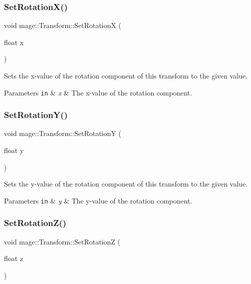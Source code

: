 \subsubsection{\texorpdfstring{Set\+Rotation\+X()}{SetRotationX()}}
{\footnotesize\ttfamily void mage\+::\+Transform\+::\+Set\+RotationX (\begin{DoxyParamCaption}\item[{float}]{x }\end{DoxyParamCaption})}

Sets the x-\/value of the rotation component of this transform to the given value.


\begin{DoxyParams}[1]{Parameters}
\mbox{\tt in}  & {\em x} & The x-\/value of the rotation component. \\
\hline
\end{DoxyParams}
\hypertarget{structmage_1_1_transform_a95c83ba282bf84aeb1c49d9ba8242609}{}\label{structmage_1_1_transform_a95c83ba282bf84aeb1c49d9ba8242609} 
\subsubsection{\texorpdfstring{Set\+Rotation\+Y()}{SetRotationY()}}
{\footnotesize\ttfamily void mage\+::\+Transform\+::\+Set\+RotationY (\begin{DoxyParamCaption}\item[{float}]{y }\end{DoxyParamCaption})}

Sets the y-\/value of the rotation component of this transform to the given value.


\begin{DoxyParams}[1]{Parameters}
\mbox{\tt in}  & {\em y} & The y-\/value of the rotation component. \\
\hline
\end{DoxyParams}
\hypertarget{structmage_1_1_transform_ac587047697f24d2279e7b4f5ab333f44}{}\label{structmage_1_1_transform_ac587047697f24d2279e7b4f5ab333f44} 
\subsubsection{\texorpdfstring{Set\+Rotation\+Z()}{SetRotationZ()}}
{\footnotesize\ttfamily void mage\+::\+Transform\+::\+Set\+RotationZ (\begin{DoxyParamCaption}\item[{float}]{z }\end{DoxyParamCaption})}

